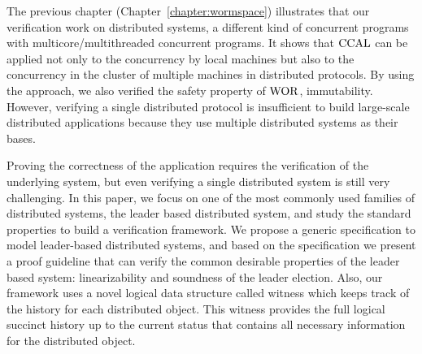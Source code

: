 The previous chapter (Chapter~\ref{chapter:wormspace}) illustrates that our verification work on distributed systems, 
a different kind of concurrent programs with multicore/multithreaded concurrent programs. 
It shows 
that $\mathrm{CCAL}$ can be applied not only to the concurrency by local machines
but also to the concurrency in the cluster of multiple machines in distributed protocols. 
By using the approach, we also verified the safety property of $\mathrm{WOR}$, immutability. 
However, verifying a single distributed protocol is insufficient to build large-scale distributed applications because they use multiple distributed systems as their bases.

Proving the correctness of the application requires the verification of the underlying system, but even verifying a single distributed system is
still very challenging. In this paper, we focus on one of the most commonly
used families of distributed systems, the leader based distributed system, and study the standard properties to build a verification framework.
We propose a generic specification to model leader-based distributed systems, and based on
the specification we present a proof guideline that can verify the common
desirable properties of the leader based system: linearizability and soundness of
the leader election. 
Also, our framework uses a novel logical data structure called witness which keeps track of the history for each distributed object.
This witness provides the full logical succinct history up to the current status that contains all necessary information for the distributed object. 




%
